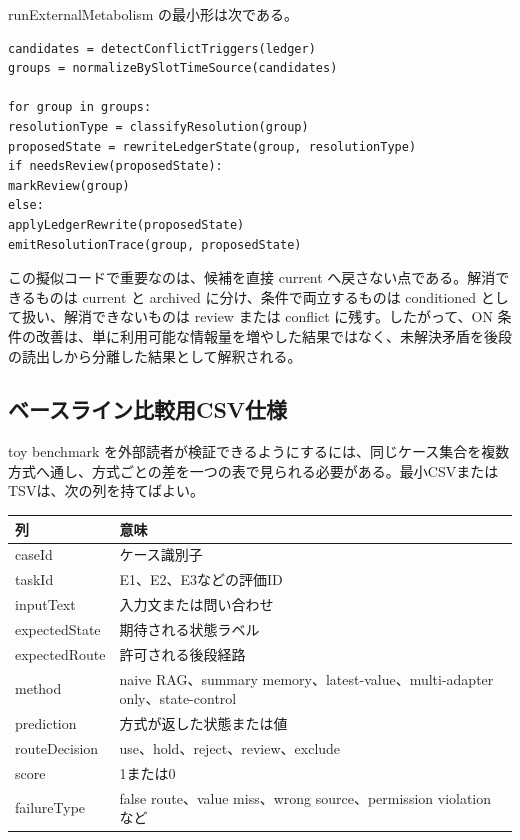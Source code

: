 \documentclass[12pt,a4paper]{article}
\begin{document}
runExternalMetabolism の最小形は次である。

\begin{verbatim}
candidates = detectConflictTriggers(ledger)
groups = normalizeBySlotTimeSource(candidates)

for group in groups:
resolutionType = classifyResolution(group)
proposedState = rewriteLedgerState(group, resolutionType)
if needsReview(proposedState):
markReview(group)
else:
applyLedgerRewrite(proposedState)
emitResolutionTrace(group, proposedState)
\end{verbatim}

この擬似コードで重要なのは、候補を直接 current へ戻さない点である。解消できるものは current と archived に分け、条件で両立するものは conditioned として扱い、解消できないものは review または conflict に残す。したがって、ON 条件の改善は、単に利用可能な情報量を増やした結果ではなく、未解決矛盾を後段の読出しから分離した結果として解釈される。

\subsection{ベースライン比較用CSV仕様}\label{ux30d9ux30fcux30b9ux30e9ux30a4ux30f3ux6bd4ux8f03ux7528csvux4ed5ux69d8}

toy benchmark を外部読者が検証できるようにするには、同じケース集合を複数方式へ通し、方式ごとの差を一つの表で見られる必要がある。最小CSVまたはTSVは、次の列を持てばよい。

{\def\LTcaptype{table} %
\begin{longtable}[]{@{}
  >{\raggedright\arraybackslash}p{}
  >{\raggedright\arraybackslash}p{}@{}}
\toprule\noalign{}
\begin{minipage}[b]{\linewidth}\raggedright
列
\end{minipage} & \begin{minipage}[b]{\linewidth}\raggedright
意味
\end{minipage} \\
\midrule\noalign{}
\endhead
\bottomrule\noalign{}
\endlastfoot
caseId & ケース識別子 \\
taskId & E1、E2、E3などの評価ID \\
inputText & 入力文または問い合わせ \\
expectedState & 期待される状態ラベル \\
expectedRoute & 許可される後段経路 \\
method & naive RAG、summary memory、latest-value、multi-adapter only、state-control \\
prediction & 方式が返した状態または値 \\
routeDecision & use、hold、reject、review、exclude \\
score & 1または0 \\
failureType & false route、value miss、wrong source、permission violation など \\
\end{longtable}
}
\end{document}

